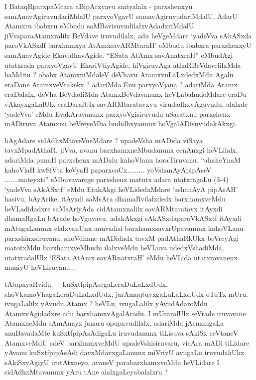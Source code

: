 \begin{artha}
I BataqRparxpaMcara aBipArxyavu sariyalalx - parxshenxyu samAnavAgiruvudariMdalU parxyoVgavU samavAgiruvudariMdalU, AdarU Atamxru ibabxru eMbudu saMBavisuvudilalxvAdadxriMdalU jiVvaparaAtamxralilx BeVdave iruvudilalx, adu heVgeMdare `yadeVva sAkASxda paroVkASxdf barxhamxya AtAmxsavARMtaraH' eMbudu ibabxra parxshenxyU samAnavAgide EkavidhavAgide. ``ESata AtAmx savAnatxraH'' eMbudAgi utatxrada parxyoVgavU EkariVtiyAgide, hiVgiruvAga athaRBeVdavelilxMda baMditu ? obabx AtamxniMdaleV deVhavu AtamxvuLaLxdedxMdu Agalu eraDane AtamxveVtakekx ? adariMda Enu parxyoVjana ? adariMda Atamx eraDalalx, deVha BeVdadiMda AtamxBeVdavanunx heVLabahudeMdare eraDu vAkayxgaLalUlx eraDaralUlx savARMtaratavxvu virudadhxvAguvudu, alalxde `yadeVva' eMdu EvakAravanunx parxyoVgisiruvudu uSasatxnu parxshenx mADiruva Atamxnu beVreyeMba budidhxyanunx hoVgalADisuvudakAkxgi.
\end{artha}


\begin{artha}
hAgAdare sidAdhxMtaveVneMdare ? upadeVsha mADida viSaya tavxMpadAthaR, jiVva, avanu barxhamxneMbudanunx cenAnxgi heVLilalx, adariMda punaH parxshenx mADalu kahoVlanu horaTiruvanu. ``ahaheYnaM kahoVlaH kwSiVta keVyaH paparxcaCx......... yoV\s shanAyApipAseV .......mateyxti'' eMbuvavarege parxshenx matutx adara utatxragaLu (3-4) `yadeVva sAkASxtf' eMdu EtakAkgi heVLidedxMdare `ashanAyA pipAsAH' hasivu, bAyArike, itAyxdi saMsAra dhamaRvilalxdedx barxhamxveMdu heVLadidadxre saMsAriyAda cidAtamxnalilx savARMtaratavx itAyxdi dhamaRgaLu bArade hoVguvavu. adakAkxgi sAkASxdaparoVkASxtf itAyxdi mAtugaLanunx elalxvanUnx anuvadisi barxhamxsavxrUpavanunx kahoVLanu parxshinxsiruvanu, shoVdhane mADidadx tavxM padAthaRkUkx beVreyAgi matotxMdu barxhamxveMbudu ilalxveMdu heVLuva udedxVshadiMda, utatxradalUlx `ESata AtAmx savARnatxraH' eMdu heVLida utatxravanenx muniyU heVLiruvanu .
\end{artha}

\begin{artha}
tAtapxyaRvidu --- kuSxtfpipAsegaLeraDuLaLxdUdx, shoVkamoVhagaLeraDuLaLxdUdx, jarAmaqtuyxgaLuLaLxdUdx oTuTx mUru. ivugaLalilx yAvudu Atamx ? heVLu, ivugaLalilx yAvudAdaroMdu AtamxvAgidadxre adu barxhamxvAgalAradu. I mUraralUlx seVrade iruvavane AtamxneMdu sAmAnayx janaru opupxvudilalx, adariMda jAcnxnigaLa anuBavadaMte kuSxtfpipAsAdigaLu iruvudanunx tiLisuva sAkiSx ceVtaneV AtamxveMdU adeV barxhamxveMdU upadeVshisiruvaru, vicAra mADi tiLidare yAvanu kuSxtfpipAsAdi davxMdavxgaLanunx miVriyU avugaLu iruvudakUkx sAkiSxyAgiyU irutAtxneyo, avaneV parabarxhamxveMdu heVLidare I sidAdhxMtavanunx yAru tAne alalxgaLeyabalalxru ?
\end{artha}

